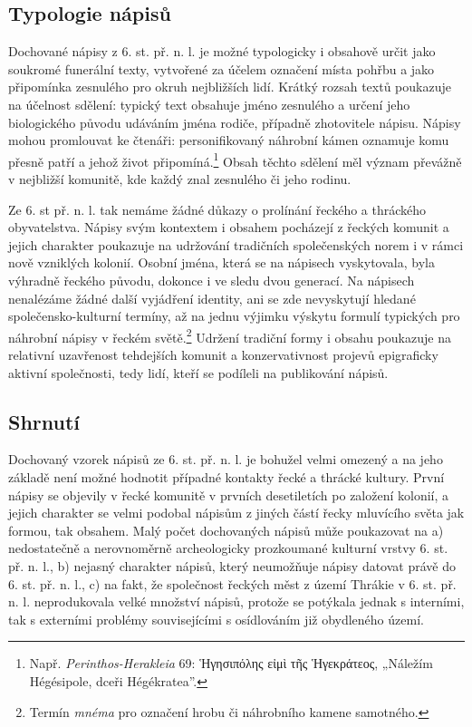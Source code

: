 \subsection[typologie-nápisů]{Typologie nápisů}

Dochované nápisy z 6. st. př. n. l. je možné typologicky i obsahově určit jako soukromé funerální texty, vytvořené za účelem označení místa pohřbu a jako připomínka zesnulého pro okruh nejbližších lidí. Krátký rozsah textů poukazuje na účelnost sdělení: typický text obsahuje jméno zesnulého a určení jeho biologického původu udáváním jména rodiče, případně zhotovitele nápisu. Nápisy mohou promlouvat ke čtenáři: personifikovaný náhrobní kámen oznamuje komu přesně patří a jehož život připomíná.\footnote{Např. {\em Perinthos-Herakleia} 69: Ἡγησιπόλης εἰμὶ τῆς Ἡγεκράτεος, „Náležím Hégésipole, dceři Hégékratea”.} Obsah těchto sdělení měl význam převážně v nejbližší komunitě, kde každý znal zesnulého či jeho rodinu.

Ze 6. st př. n. l. tak nemáme žádné důkazy o prolínání řeckého a thráckého obyvatelstva. Nápisy svým kontextem i obsahem pocházejí z řeckých komunit a jejich charakter poukazuje na udržování tradičních společenských norem i v rámci nově vzniklých kolonií. Osobní jména, která se na nápisech vyskytovala, byla výhradně řeckého původu, dokonce i ve sledu dvou generací. Na nápisech nenalézáme žádné další vyjádření identity, ani se zde nevyskytují hledané společensko-kulturní termíny, až na jednu výjimku výskytu formulí typických pro náhrobní nápisy v řeckém světě.\footnote{Termín {\em mnéma} pro označení hrobu či náhrobního kamene samotného.} Udržení tradiční formy i obsahu poukazuje na relativní uzavřenost tehdejších komunit a konzervativnost projevů epigraficky aktivní společnosti, tedy lidí, kteří se podíleli na publikování nápisů.

\subsection[shrnutí-3]{Shrnutí}

Dochovaný vzorek nápisů ze 6. st. př. n. l. je bohužel velmi omezený a na jeho základě není možné hodnotit případné kontakty řecké a thrácké kultury. První nápisy se objevily v řecké komunitě v prvních desetiletích po založení kolonií, a jejich charakter se velmi podobal nápisům z jiných částí řecky mluvícího světa jak formou, tak obsahem. Malý počet dochovaných nápisů může poukazovat na a) nedostatečně a nerovnoměrně archeologicky prozkoumané kulturní vrstvy 6. st. př. n. l., b) nejasný charakter nápisů, který neumožňuje nápisy datovat právě do 6. st. př. n. l., c) na fakt, že společnost řeckých měst z území Thrákie v 6. st. př. n. l. neprodukovala velké množství nápisů, protože se potýkala jednak s interními, tak s externími problémy souvisejícími s osídlováním již obydleného území.

